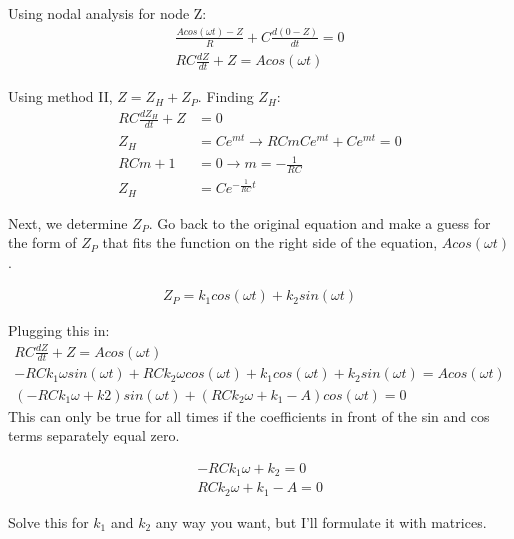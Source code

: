 Using nodal analysis for node Z:
\begin{align*}
\frac{Acos(\omega t)-Z}{R}+C\frac{d(0-Z)}{dt}=0\\
RC\frac{dZ}{dt}+Z=Acos(\omega t)
\end{align*}

Using method II, $Z = Z_H+Z_P$. Finding $Z_H$:
\begin{align*}
RC\frac{dZ_H}{dt}+Z&=0\\
Z_H&=Ce^{mt} \rightarrow RCmCe^{mt}+Ce^{mt}=0\\
RCm+1&=0 \rightarrow m=-\frac{1}{RC}\\
Z_H&=Ce^{-\frac{1}{RC}t}
\end{align*}

Next, we determine $Z_P$. Go back to the original equation and make a guess for the form of $Z_P$ that fits the function on the right side of the equation, $Acos(\omega t)$.\par

\begin{align*}
Z_P=k_1cos(\omega t)+k_2sin(\omega t)
\end{align*}

Plugging this in: 
\begin{align*}
RC\frac{dZ}{dt}+Z=Acos(\omega t)\\
-RCk_1\omega sin(\omega t)+RCk_2\omega cos(\omega t)+k_1cos(\omega t)+k_2sin(\omega t)=Acos(\omega t)\\
(-RCk_1\omega+k2) sin(\omega t)+(RCk_2\omega+k_1-A) cos(\omega t)=0
\end{align*}
This can only be true for all times if the coefficients  in front of the sin and cos terms separately equal zero. 

\begin{align*}
-RCk_1\omega+k_2 =0\\
RCk_2\omega+k_1-A=0
\end{align*}

Solve this for $k_1$ and $k_2$ any way you want, but I'll formulate it with matrices.

